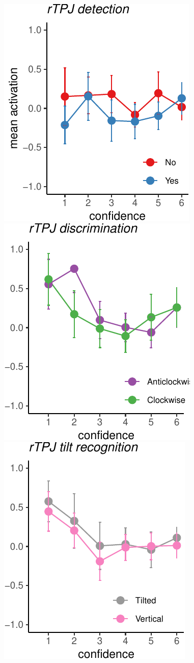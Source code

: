 \documentclass[
]{article}
\begin{document}
\includegraphics{Chudi-Thesis-2020_files/figure-latex/unnamed-chunk-8-1.pdf}
\includegraphics{Chudi-Thesis-2020_files/figure-latex/unnamed-chunk-8-2.pdf}
\includegraphics{Chudi-Thesis-2020_files/figure-latex/unnamed-chunk-8-3.pdf}
~
\end{document}

